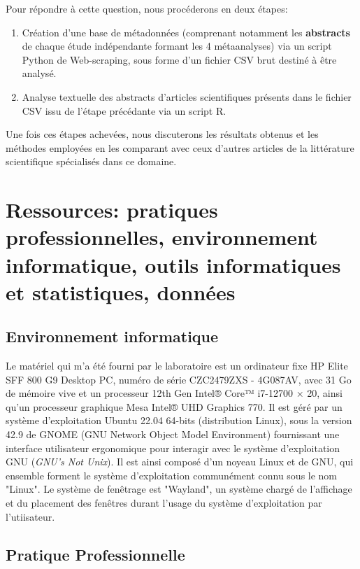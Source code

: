 \documentclass{book}
\begin{document}
\vspace{\baselineskip}
Pour répondre à cette question, nous procéderons en deux étapes: 
\begin{enumerate}
    \item Création d'une base de métadonnées (comprenant notamment les \textbf{abstracts} de chaque étude indépendante formant les 4 métaanalyses) via un script Python de Web-scraping, sous forme d'un fichier CSV brut destiné à être analysé.
    \item Analyse textuelle des abstracts d'articles scientifiques présents dans le fichier CSV issu de l'étape précédante via un script R.
\end{enumerate}
\vspace{\baselineskip}
Une fois ces étapes achevées, nous discuterons les résultats obtenus et les méthodes employées en les comparant avec ceux d'autres articles de la littérature scientifique spécialisés dans ce domaine.
\thispagestyle{fancy}

\chapter[Ressources]{\label{Second Chapitre}Ressources: pratiques
  professionnelles, environnement informatique, outils informatiques et
  statistiques, données}
\section{Environnement informatique}
\noindent
Le matériel qui m'a été fourni par le laboratoire est un ordinateur fixe HP Elite SFF 800 G9 Desktop PC, numéro de série CZC2479ZXS - 4G087AV, avec 31 Go de mémoire vive et un processeur 12th Gen Intel® Core™ i7-12700 × 20, ainsi qu'un processeur graphique Mesa Intel® UHD Graphics 770. Il est géré par un système d'exploitation Ubuntu 22.04 64-bits (distribution Linux), sous la version 42.9 de GNOME (GNU Network Object Model Environment) fournissant une interface utilisateur ergonomique pour interagir avec le système d'exploitation GNU  (\textit{GNU's Not Unix}). Il est ainsi composé d'un noyeau Linux et de GNU, qui ensemble forment le système d'exploitation communément connu sous le nom "Linux". Le système de fenêtrage est "Wayland", un système chargé de l'affichage et du placement des fenêtres durant l'usage du système d'exploitation par l'utiisateur.

\section{Pratique Professionnelle}
\end{document}
